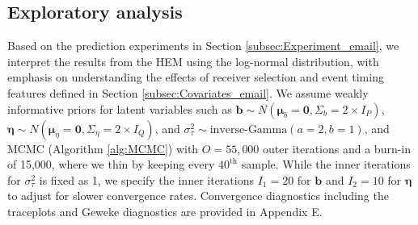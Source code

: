 \documentclass[ba]{imsart}
\numberwithin{equation}{section}
\theoremstyle{plain}
\begin{document}
	\subsection{Exploratory analysis}\label{subsec:Result_email}
	Based on the prediction experiments in Section \ref{subsec:Experiment_email}, we interpret the results from the HEM using the log-normal distribution, with emphasis on understanding the effects of receiver selection and event timing features defined in Section \ref{subsec:Covariates_email}. We assume weakly informative priors for latent variables such as $\boldsymbol{b}\sim N(\boldsymbol{\mu}_b=\boldsymbol{0}, \Sigma_b = 2\times I_P)$, $\boldsymbol{\eta}\sim N(\boldsymbol{\mu}_\eta=\boldsymbol{0}, \Sigma_\eta = 2\times I_Q)$, and $\sigma_\tau^2 \sim \mbox{inverse-Gamma}(a=2, b=1)$, and MCMC (Algorithm \ref{alg:MCMC}) with $O=55,000$ outer iterations and a burn-in of 15,000, where we thin by keeping every $40^{\textrm{th}}$ sample. While the inner iterations for $\sigma_\tau^2$ is fixed as 1, we specify the inner iterations $I_1=20$ for $\boldsymbol{b}$ and $I_2=10$ for $\boldsymbol{\eta}$ to adjust for slower convergence rates. Convergence diagnostics including the traceplots and Geweke diagnostics \citep{geweke1991evaluating} are provided in Appendix E.
	
\end{document}
